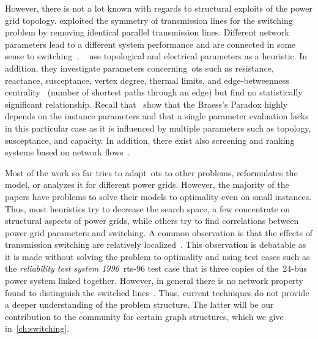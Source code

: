 However, there is not a lot known with regards to structural exploits of the
power grid topology. \textcite{6169974,6799266} exploited the symmetry of
transmission lines for the switching problem by removing identical parallel
transmission lines. Different network parameters lead to a different system
performance and are connected in some sense to
switching~\parencite{BOMPARD20095,doi:10.1063/1.3077229,4438889}.
% 
{\hypersetup{citecolor=black}\citeauthor{6480106}}~\parencite{6069831,6480106,6039669} 
% 
use topological and electrical parameters as a heuristic. In addition, they
investigate parameters concerning~\gls{ots} such as resistance, reactance,
susceptance, vertex degree, thermal limits, and edge-betweenness
centrality~\cite{4438889} (number of shortest paths through an edge) but find no
statistically significant relationship.
% 
Recall that~\textcite{Pas97} show that the Braess's Paradox highly depends on
the instance parameters and that a single parameter evaluation lacks in this
particular case as it is influenced by multiple parameters such as
topology, susceptance, and capacity.
% 
In addition, there exist also screening and ranking systems based on network
flows~\parencite{4334990,486127}.

Most of the work so far tries to adapt~\gls{ots} to other problems, 
% 
reformulates the model, or analyzes it for different power grids. However, the
majority of the papers have problems to solve their models to optimality even on
small instances. Thus, most heuristics try to decrease the search space, a few
concentrate on structural aspects of power grids, while others try to find
correlations between power grid parameters and switching.
%
A common observation is that the effects of transmission switching are
relatively localized~\parencite{6069831,6039669,GLAVITSCH198592}. This
observation is debatable as it is made without solving the problem to optimality
and using test cases such as the \emph{reliability test system
1996}~\gls{rts}-96 test case that is three copies of the~24-bus power system 
linked together. However, in general there is no network property found to
distinguish the switched lines~\parencite{6039669}. Thus, current techniques do
not provide a deeper understanding of the problem structure. The latter will be
our contribution to the community for certain graph structures, which we give
in~\cref{ch:switching}.
% 
